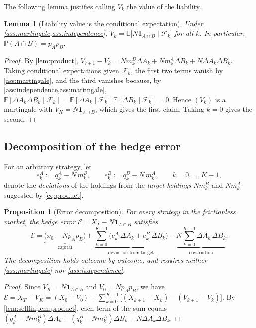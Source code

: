 \documentclass[11pt,a4paper]{article}
\theoremstyle{plain}
\newtheorem{proposition}[theorem]{Proposition}
\newtheorem{lemma}[theorem]{Lemma}
\theoremstyle{definition}
\theoremstyle{remark}
\newcommand{\E}{\mathbb{E}}
\newcommand{\Prob}{\mathbb{P}}
\newcommand{\1}{\mathbf{1}}
\newcommand{\F}{\mathcal{F}}
\begin{document}
The following lemma justifies calling $V_k$ the value of the liability.

\begin{lemma}[Liability value is the conditional expectation]
\label{lem:liability-value}
Under \cref{ass:martingale,ass:independence}, $V_k = \E\bigl[N\1_{A\cap B}\mid\F_k\bigr]$ for all $k$. In particular, $\Prob(A\cap B) = p_Ap_B$.
\end{lemma}

\begin{proof}
By \cref{lem:product}, $V_{k+1}-V_k = Nm^B_k\Delta A_k + Nm^A_k\Delta B_k + N\Delta A_k\Delta B_k$. Taking conditional expectations given $\F_k$, the first two terms vanish by \cref{ass:martingale}, and the third vanishes because, by \cref{ass:independence,ass:martingale}, $\E[\Delta A_k\Delta B_k\mid\F_k] = \E[\Delta A_k\mid\F_k]\,\E[\Delta B_k\mid\F_k] = 0$. Hence $(V_k)$ is a martingale with $V_K = N\1_{A\cap B}$, which gives the first claim. Taking $k=0$ gives the second.
\end{proof}

\subsection{Decomposition of the hedge error}

For an arbitrary strategy, let
\[
e^A_k := q^A_k - N\,m^B_k,\qquad e^B_k := q^B_k - N\,m^A_k,\qquad k=0,\dots,K-1,
\]
denote the \emph{deviations} of the holdings from the \emph{target holdings} $Nm^B_k$ and $Nm^A_k$ suggested by \eqref{eq:product}.

\begin{proposition}[Error decomposition]
\label{prop:decomposition}
For every strategy in the frictionless market, the hedge error $\mathcal{E} = X_T - N\1_{A\cap B}$ satisfies
\begin{equation}
\label{eq:decomposition}
\mathcal{E} = \underbrace{\bigl(x_0 - Np_Ap_B\bigr)}_{\text{capital}} + \underbrace{\sum_{k=0}^{K-1}\bigl(e^A_k\,\Delta A_k + e^B_k\,\Delta B_k\bigr)}_{\text{deviation from target}} - \underbrace{N\sum_{k=0}^{K-1}\Delta A_k\,\Delta B_k}_{\text{covariation}}.
\end{equation}
The decomposition holds outcome by outcome, and requires neither \cref{ass:martingale} nor \cref{ass:independence}.
\end{proposition}

\begin{proof}
Since $V_K = N\1_{A\cap B}$ and $V_0 = Np_Ap_B$, we have $\mathcal{E} = X_T - V_K = (X_0 - V_0) + \sum_{k=0}^{K-1}\bigl[(X_{k+1}-X_k) - (V_{k+1}-V_k)\bigr]$. By \cref{lem:selffin,lem:product}, each term of the sum equals $(q^A_k - Nm^B_k)\Delta A_k + (q^B_k - Nm^A_k)\Delta B_k - N\Delta A_k\Delta B_k$.
\end{proof}
\end{document}
